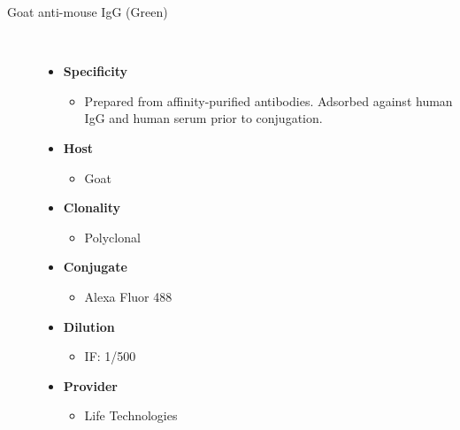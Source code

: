 \begin{description}
   \item[Goat anti-mouse IgG (Green)]~\par
   

   \begin{itemize}
      \item[] \textbf{Specificity}
      \begin{itemize}
         \item[] Prepared from affinity-purified antibodies. Adsorbed against human IgG and human serum prior to conjugation.
      \end{itemize}
      \item[] \textbf{Host}
      \begin{itemize}
      \item[] Goat
      \end{itemize}
            \item[] \textbf{Clonality}
      \begin{itemize}
      \item[] Polyclonal
      \end{itemize}
            \item[] \textbf{Conjugate}
      \begin{itemize}
      \item[]Alexa Fluor\textsuperscript{\textregistered} 488 
      \end{itemize}
                  \item[] \textbf{Dilution}
      \begin{itemize}
      \item[]IF: 1/500 
      \end{itemize}       
                  \item[] \textbf{Provider}
      \begin{itemize}
      \item[] Life Technologies
      \end{itemize}     
   \end{itemize}
   


\end{description}
